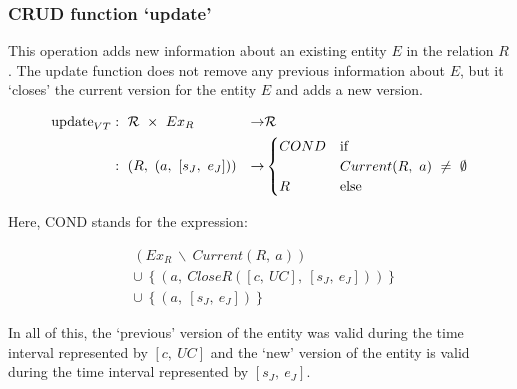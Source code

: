 \subsubsection{\label{subsubsec:modify}CRUD function `update'}
This operation adds new information about an existing entity $E$ in the relation $R$. The update function does not remove any previous information about $E$, but it `closes' the current version for the entity $E$ and adds a new version.



\begin{align}
\text{update}_{VT} & :\ \Rel\ \times\ Ex_{R} & \rightarrow & \Rel \nonumber \\
							& :\ \left(R,\ \left(a,\ \left[s_{J},\ e_{J}\right]\right)\right) & \rightarrow & 
							\begin{cases}
							COND & \text{if } \\
							& Current(R,\ a)\ \neq\ \emptyset \\							
							R & \text{else }
							\end{cases}
							\nonumber
\end{align}

Here, COND stands for the expression:

\begin{align}
& \left(Ex_{R}\ \backslash\ Current\left(R,\ a\right)\right) \nonumber \\
& \cup\ \left\{\left(a,\ CloseR\left(\left[c,\ UC\right],\ \left[s_{J},\ e_{J}\right]\right)\right)\right\} \nonumber \\
& \cup\ \left\{\left(a,\ \left[s_{J},\ e_{J}\right]\right)\right\} \nonumber
\end{align}

In all of this, the `previous' version of the entity was valid during the time interval represented by $\left[c,\ UC\right]$ and the `new' version of the entity is valid during the time interval represented by $\left[s_{J},\ e_{J}\right]$.



